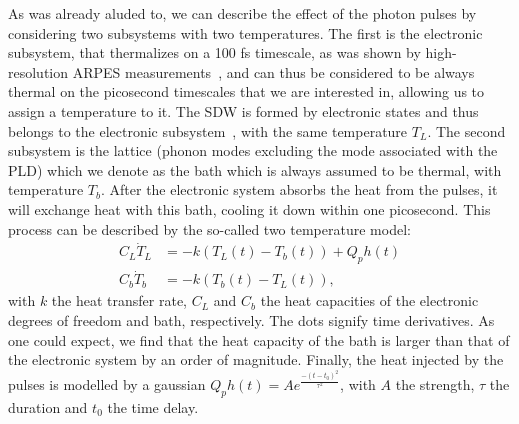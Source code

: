 
As was already aluded to, we can describe the effect of the photon pulses by considering two subsystems with two temperatures.
The first is the electronic subsystem, that thermalizes on a 100 fs timescale, as was shown by high-resolution ARPES measurements~\cite{Nicholson2016}, and can thus be considered to be always thermal on the picosecond timescales that we are interested in, allowing us to assign a temperature to it.
The SDW is formed by electronic states and thus belongs to the electronic subsystem~\cite{Nicholson2016}, with the same temperature $T_L$.
The second subsystem is the lattice (phonon modes excluding the mode associated with the PLD) which we denote as the bath which is always assumed to be thermal, with temperature $T_b$.
After the electronic system absorbs the heat from the pulses, it will exchange heat with this bath, cooling it down within one picosecond.
This process can be described by the so-called two temperature model:
\begin{align}
	\label{eq:Cr_twotemp}
	C_L \dot{T}_L &= -k(T_L(t) - T_b(t)) + Q_ph(t) \\
	C_b \dot{T}_b &= -k(T_b(t) - T_L(t)),\nonumber
\end{align}
with $k$ the heat transfer rate, $C_L$ and $C_b$ the heat capacities of the electronic degrees of freedom and bath, respectively.
The dots signify time derivatives.
As one could expect, we find that the heat capacity of the bath is larger than that of the electronic system by an order of magnitude.
Finally, the heat injected by the pulses is modelled by a gaussian $Q_ph(t) = A e^{\frac{-(t - t_0)^2}{\tau^2}}$, with $A$ the strength, $\tau$ the duration and $t_0$ the time delay.

